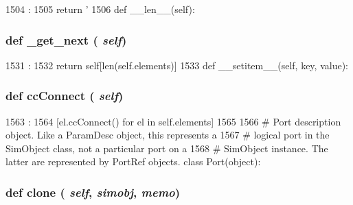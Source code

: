 \begin{DoxyCode}
1504                      :
1505         return '%
1506 
    def __len__(self):
\end{DoxyCode}
\hypertarget{classm5_1_1params_1_1VectorPortRef_a8272147f66bd35474aecd93e8746004a}{
\subsubsection[{\_\-get\_\-next}]{\setlength{\rightskip}{0pt plus 5cm}def \_\-get\_\-next ( {\em self})}}
\label{classm5_1_1params_1_1VectorPortRef_a8272147f66bd35474aecd93e8746004a}



\begin{DoxyCode}
1531                        :
1532         return self[len(self.elements)]
1533 
    def __setitem__(self, key, value):
\end{DoxyCode}
\hypertarget{classm5_1_1params_1_1VectorPortRef_addaf6e2a0c3ee33ece43bba237efcd7d}{
\subsubsection[{ccConnect}]{\setlength{\rightskip}{0pt plus 5cm}def ccConnect ( {\em self})}}
\label{classm5_1_1params_1_1VectorPortRef_addaf6e2a0c3ee33ece43bba237efcd7d}



\begin{DoxyCode}
1563                        :
1564         [el.ccConnect() for el in self.elements]
1565 
1566 # Port description object.  Like a ParamDesc object, this represents a
1567 # logical port in the SimObject class, not a particular port on a
1568 # SimObject instance.  The latter are represented by PortRef objects.
class Port(object):
\end{DoxyCode}
\hypertarget{classm5_1_1params_1_1VectorPortRef_a4110248fff184e40b53c1cfa2bc3c649}{
\subsubsection[{clone}]{\setlength{\rightskip}{0pt plus 5cm}def clone ( {\em self}, \/   {\em simobj}, \/   {\em memo})}}
\label{classm5_1_1params_1_1VectorPortRef_a4110248fff184e40b53c1cfa2bc3c649}



